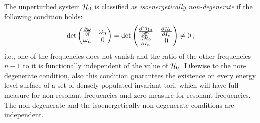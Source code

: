 The unperturbed system $\mathcal{H}_0$ is classified as \textit{isoenergetically non-degenerate} if the following condition holds:
\begingroup
\renewcommand*{\arraystretch}{1.5}
\begin{equation}
    \operatorname{det}\begin{pmatrix}
    \frac{\partial \boldsymbol{\omega}}{\partial \vb{I}} & \omega_n \\
    \omega_n & 0
    \end{pmatrix}=\operatorname{det}\begin{pmatrix}
    \frac{\partial^2 \mathcal{H}_0}{\partial \vb{I}^2} & \frac{\partial \mathcal{H}_0}{\partial I_n} \\
    \frac{\partial \mathcal{H}_0}{\partial I_n} & 0
    \end{pmatrix} \neq 0 \,,
\end{equation}
\endgroup
i.e., one of the frequencies does not vanish and the ratio of the other frequencies $n-1$ to it is functionally independent of the value of $\mathcal{H}_0$. Likewise to the non-degenerate condition, also this condition guarantees the existence on every energy level surface of a set of densely populated invariant tori, which will have full measure for non-resonant frequencies and zero measure for resonant frequencies. The non-degenerate and the isoenergetically non-degenerate conditions are independent.

